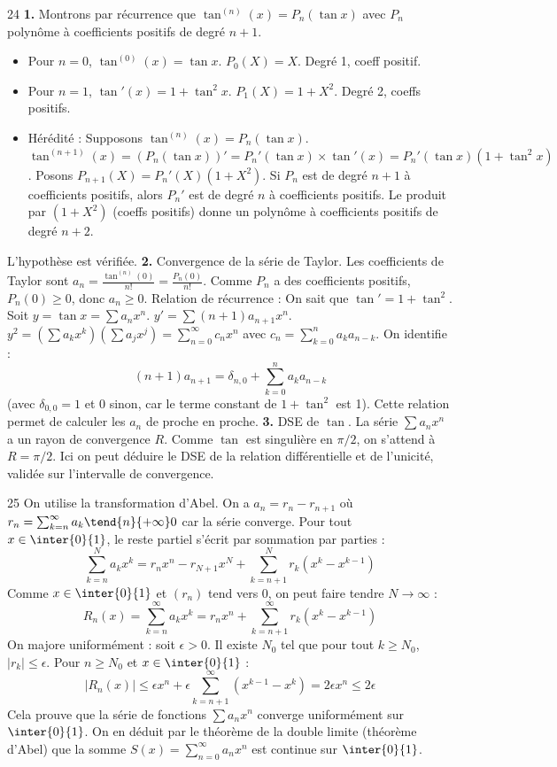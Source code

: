 \begin{correction}{24}
\textbf{1.} Montrons par récurrence que $\tan^{(n)}(x) = P_n(\tan x)$ avec $P_n$ polynôme à coefficients positifs de degré $n+1$. 
\begin{itemize}
 \item Pour $n=0$, $\tan^{(0)}(x) = \tan x$. $P_0(X) = X$. Degré 1, coeff positif. 
 \item Pour $n=1$, $\tan'(x) = 1 + \tan^2 x$. $P_1(X) = 1+X^2$. Degré 2, coeffs positifs. 
 \item Hérédité : Supposons $\tan^{(n)}(x) = P_n(\tan x)$. 
 $\tan^{(n+1)}(x) = (P_n(\tan x))' = P_n'(\tan x) \times \tan'(x) = P_n'(\tan x) (1+\tan^2 x)$. 
 Posons $P_{n+1}(X) = P_n'(X)(1+X^2)$. 
 Si $P_n$ est de degré $n+1$ à coefficients positifs, alors $P_n'$ est de degré $n$ à coefficients positifs. 
 Le produit par $(1+X^2)$ (coeffs positifs) donne un polynôme à coefficients positifs de degré $n+2$. 
\end{itemize}
L'hypothèse est vérifiée. 
\textbf{2.} Convergence de la série de Taylor. 
Les coefficients de Taylor sont $a_n = \frac{\tan^{(n)}(0)}{n!} = \frac{P_n(0)}{n!}$. 
Comme $P_n$ a des coefficients positifs, $P_n(0) \ge 0$, donc $a_n \ge 0$. 
Relation de récurrence : On sait que $\tan' = 1 + \tan^2$. 
Soit $y = \tan x = \sum a_n x^n$. $y' = \sum (n+1)a_{n+1} x^n$. 
$y^2 = \left( \sum a_k x^k \right) \left( \sum a_j x^j \right) = \sum_{n=0}^\infty c_n x^n$ avec $c_n = \sum_{k=0}^n a_k a_{n-k}$. 
On identifie :
$$ (n+1)a_{n+1} = \delta_{n,0} + \sum_{k=0}^n a_k a_{n-k} $$ 
(avec $\delta_{0,0}=1$ et 0 sinon, car le terme constant de $1+\tan^2$ est 1). 
Cette relation permet de calculer les $a_n$ de proche en proche. 
\textbf{3.} DSE de $\tan$. 
La série $\sum a_n x^n$ a un rayon de convergence $R$. 
Comme $\tan$ est singulière en $\pi/2$, on s'attend à $R = \pi/2$. 
Ici on peut déduire le DSE de la relation différentielle et de l'unicité, validée sur l'intervalle de convergence. 
\end{correction}

\begin{correction}{25}
On utilise la transformation d'Abel. 
On a $a_n = r_n - r_{n+1}$ où $r_n = \sum_{k=n}^\infty a_k \tend{n}{+\infty} 0$ car la série converge. 
Pour tout $x \in \inter{0}{1}$, le reste partiel s'écrit par sommation par parties : 
$$ \sum_{k=n}^N a_k x^k = r_n x^n - r_{N+1}x^N + \sum_{k=n+1}^N r_k (x^k - x^{k-1}) $$
Comme $x \in \inter{0}{1}$ et $(r_n)$ tend vers 0, on peut faire tendre $N \to \infty$ :
$$ R_n(x) = \sum_{k=n}^\infty a_k x^k = r_n x^n + \sum_{k=n+1}^\infty r_k (x^k - x^{k-1}) $$ 
On majore uniformément : soit $\epsilon > 0$. Il existe $N_0$ tel que pour tout $k \ge N_0$, $|r_k| \le \epsilon$. 
Pour $n \ge N_0$ et $x \in \inter{0}{1}$ : 
$$ |R_n(x)| \le \epsilon x^n + \epsilon \sum_{k=n+1}^\infty (x^{k-1} - x^k) = 2\epsilon x^n \le 2\epsilon $$ 
Cela prouve que la série de fonctions $\sum a_n x^n$ converge uniformément sur $\inter{0}{1}$. 
On en déduit par le théorème de la double limite (théorème d'Abel) que la somme $S(x) = \sum_{n=0}^\infty a_n x^n$ est continue sur $\inter{0}{1}$. 
\end{correction}
